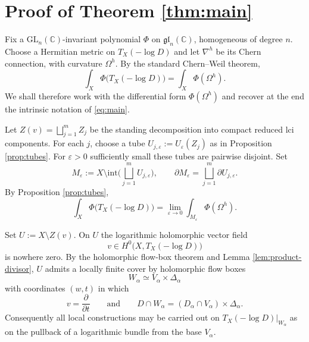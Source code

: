\documentclass[12pt,a4paper,dvipsnames,x11names]{amsart}
\numberwithin{equation}{section}
\theoremstyle{plain}
\theoremstyle{definition}
\theoremstyle{remark}
\newcommand{\CC}{\mathbb C}
\newcommand{\GL}{\mathrm{GL}}
\begin{document}
\section{Proof of Theorem \ref{thm:main}}\label{sec:proof-final}

Fix a $\GL_n(\CC)$-invariant polynomial $\Phi$ on $\mathfrak{gl}_n(\CC)$, homogeneous of degree $n$. Choose a Hermitian metric on $T_X(-\log D)$ and let $\nabla^h$ be its Chern connection, with curvature $\Omega^h$. By the standard Chern--Weil theorem,
\begin{equation}\label{eq:CW-proof}
\int_X \Phi\bigl(T_X(-\log D)\bigr)=\int_X \Phi(\Omega^h).
\end{equation}
We shall therefore work with the differential form $\Phi(\Omega^h)$ and recover at the end the intrinsic notation of \eqref{eq:main}.

Let $Z(v)=\bigsqcup_{j=1}^m Z_j$ be the standing decomposition into compact reduced lci components. For each $j$, choose a tube $U_{j,\varepsilon}:=U_\varepsilon(Z_j)$ as in Proposition \ref{prop:tubes}. For $\varepsilon>0$ sufficiently small these tubes are pairwise disjoint. Set
\begin{equation}\label{eq:Meps}
M_\varepsilon:=X\setminus \mathrm{int}\Big(\bigsqcup_{j=1}^m U_{j,\varepsilon}\Big),
\qquad
\partial M_\varepsilon=\bigsqcup_{j=1}^m \partial U_{j,\varepsilon}.
\end{equation}
By Proposition \ref{prop:tubes},
\begin{equation}\label{eq:limit}
\int_X \Phi\bigl(T_X(-\log D)\bigr)=\lim_{\varepsilon\to 0}\int_{M_\varepsilon}\Phi(\Omega^h).
\end{equation}

Set $U:=X\setminus Z(v)$. On $U$ the logarithmic holomorphic vector field
$$
v\in H^0\bigl(X,T_X(-\log D)\bigr)
$$
is nowhere zero. By the holomorphic flow-box theorem and Lemma \ref{lem:product-divisor}, $U$ admits a locally finite cover by holomorphic flow boxes
\begin{equation}\label{eq:flow-box-cover}
W_\alpha\simeq V_\alpha\times \Delta_\alpha
\end{equation}
with coordinates $(w,t)$ in which
\begin{equation}\label{eq:flow-box-v}
v=\frac{\partial}{\partial t}
\qquad \text{and} \qquad
D\cap W_\alpha=(D_\alpha\cap V_\alpha)\times \Delta_\alpha.
\end{equation}
Consequently all local constructions may be carried out on $T_X(-\log D)|_{W_\alpha}$ as on the pullback of a logarithmic bundle from the base $V_\alpha$.
\end{document}
